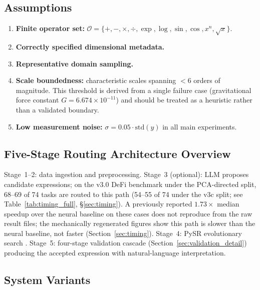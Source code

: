 \documentclass[twoside,11pt]{article}
\begin{document}
\subsection{Assumptions}\label{subsec:assumptions}
\label{sec:assumptions}

\begin{enumerate}
\item \textbf{Finite operator set:}
  $\mathcal{O} = \{+,-,\times,\div,\exp,\log,\sin,\cos,x^n,\sqrt{x}\}$.
\item \textbf{Correctly specified dimensional metadata.}
\item \textbf{Representative domain sampling.}
\item \textbf{Scale boundedness:} characteristic scales spanning
  $<6$ orders of magnitude.
  This threshold is derived from a single failure case (gravitational force
  constant $G = 6.674 \times 10^{-11}$) and should be treated as a heuristic
  rather than a validated boundary.
\item \textbf{Low measurement noise:}
  $\sigma = 0.05 \cdot \mathrm{std}(y)$ in all main experiments.
\end{enumerate}

\subsection{Five-Stage Routing Architecture Overview}\label{subsec:fivestage-routing-architecture-overview}
\label{sec:validation_framework}

Stage~1--2: data ingestion and preprocessing.
Stage~3 (optional): LLM proposes candidate expressions; on the v3.0 DeFi
benchmark under the PCA-directed split, 68--69 of 74 tasks are routed to
this path (54--55 of 74 under the v3c split; see
Table~\ref{tab:timing_full}, \S\ref{sec:timing}). A previously reported
$1.73\times$ median speedup over the neural baseline on these cases does
not reproduce from the raw result files; the mechanically regenerated
figures show this path is slower than the neural baseline, not faster
(Section~\ref{sec:timing}).
Stage~4: PySR evolutionary search \citep{cranmer2023pysr}.
Stage~5: four-stage validation cascade (Section~\ref{sec:validation_detail})
producing the accepted expression with natural-language interpretation.

\subsection{System Variants}\label{subsec:system-variants}
\label{sec:arch_variants}
\end{document}
